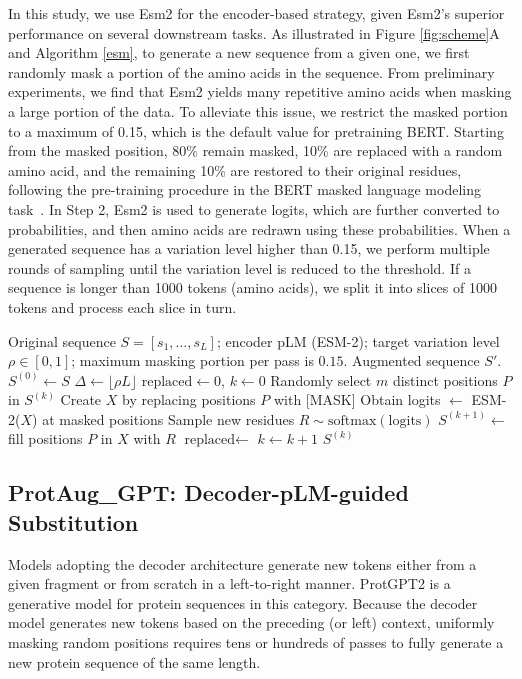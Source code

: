 \documentclass{article}
\begin{document}
In this study, we use Esm2 for the encoder-based strategy, given Esm2's superior performance on several downstream tasks. As illustrated in Figure \ref{fig:scheme}A and Algorithm \ref{esm}, to generate a new sequence from a given one, we first randomly mask a portion of the amino acids in the sequence. From preliminary experiments, we find that Esm2 yields many repetitive amino acids when masking a large portion of the data. To alleviate this issue, we restrict the masked portion to a maximum of 0.15, which is the default value for pretraining BERT. Starting from the masked position, 80\% remain masked, 10\% are replaced with a random amino acid, and the remaining 10\% are restored to their original residues, following the pre-training procedure in the BERT masked language modeling task~\cite{devlin2019bert}. In Step 2, Esm2 is used to generate logits, which are further converted to probabilities, and then amino acids are redrawn using these probabilities. When a generated sequence has a variation level higher than 0.15, we perform multiple rounds of sampling until the variation level is reduced to the threshold. If a sequence is longer than 1000 tokens (amino acids), we split it into slices of 1000 tokens and process each slice in turn.

\begin{algorithm}[ht]
\caption{ProtAug\_Esm: Encoder-pLM-guided Substitution}
\begin{algorithmic}[1]
\REQUIRE Original sequence $S = [s_1, \dots, s_L]$; encoder pLM (ESM-2); target variation level $\rho \in [0,1]$; maximum masking portion per pass is $0.15$.
\ENSURE Augmented sequence $S'$.
\STATE $S^{(0)} \leftarrow S$
\STATE $\Delta \leftarrow \lfloor\rho L\rfloor$      
\STATE $\text{replaced} \leftarrow 0$, $k \leftarrow 0$ 
   \STATE Randomly select $m$ distinct positions $P$ in $S^{(k)}$
   \STATE Create $X$ by replacing positions $P$ with [MASK]
   \STATE Obtain logits $\leftarrow$ ESM-2($X$) at masked positions
   \STATE Sample new residues $R \sim \text{softmax}(\text{logits})$
   \STATE $S^{(k+1)} \leftarrow$ fill positions $P$ in $X$ with $R$
   \STATE $\text{replaced} \leftarrow $ 
   \STATE $k \leftarrow k+1$
\ENDWHILE
\RETURN $S^{(k)}$
\end{algorithmic}
\label{esm}
\end{algorithm}


\subsection{ProtAug\_GPT: Decoder-pLM-guided Substitution}
Models adopting the decoder architecture generate new tokens either from a given fragment or from scratch in a left-to-right manner. ProtGPT2 is a generative model for protein sequences in this category. Because the decoder model generates new tokens based on the preceding (or left) context, uniformly masking random positions requires tens or hundreds of passes to fully generate a new protein sequence of the same length. 
\end{document}
